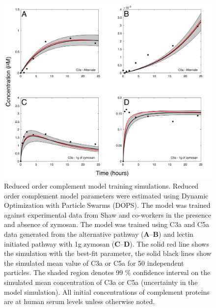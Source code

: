 \documentclass[12pt]{article}
\begin{document}
\begin{figure}[h]
\centering
\includegraphics[width=1.0\textwidth]{./figs/Figure2_Fit.pdf}
\caption{Reduced order complement model training simulations. Reduced order complement model parameters were estimated using Dynamic Optimization with Particle Swarms (DOPS). The model was trained against experimental data from Shaw and co-workers \cite{morad2015time} in the presence and absence of zymosan. The model was trained using C3a and C5a data generated from the alternative pathway (\textbf{A}--\textbf{B}) and lectin initiated pathway with 1g zymosan (\textbf{C}--\textbf{D}). The solid red line shows the simulation with the best-fit parameter, the solid black lines show the simulated mean value of C3a or C5a for 50 independent particles. The shaded region denotes 99 \% confidence interval on the simulated mean concentration of C3a or C5a (uncertainty in the model simulation). All initial concentrations of complement proteins are at human serum levels unless otherwise noted.}\label{fig-fit}
\end{figure}
\end{document}
